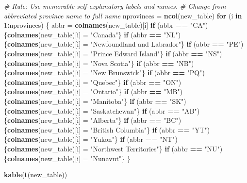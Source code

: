 \documentclass[9pt,letter]{article}
\newenvironment{Shaded}{\begin{snugshade}}{\end{snugshade}}
\newcommand{\KeywordTok}[1]{\textcolor[rgb]{0.13,0.29,0.53}{\textbf{#1}}}
\newcommand{\DecValTok}[1]{\textcolor[rgb]{0.00,0.00,0.81}{#1}}
\newcommand{\StringTok}[1]{\textcolor[rgb]{0.31,0.60,0.02}{#1}}
\newcommand{\CommentTok}[1]{\textcolor[rgb]{0.56,0.35,0.01}{\textit{#1}}}
\newcommand{\ControlFlowTok}[1]{\textcolor[rgb]{0.13,0.29,0.53}{\textbf{#1}}}
\newcommand{\OperatorTok}[1]{\textcolor[rgb]{0.81,0.36,0.00}{\textbf{#1}}}
\newcommand{\NormalTok}[1]{#1}
\begin{document}
\begin{Shaded}
\begin{Highlighting}[]
\CommentTok{# Rule: Use memorable self-explanatory labels and names.}
\CommentTok{# Change from abbreviated province name to full name}
\NormalTok{nprovinces =}\StringTok{ }\KeywordTok{ncol}\NormalTok{(new_table)}
\ControlFlowTok{for}\NormalTok{ (i }\ControlFlowTok{in} \DecValTok{1}\OperatorTok{:}\NormalTok{nprovinces) \{}
\NormalTok{  abbr =}\StringTok{ }\KeywordTok{colnames}\NormalTok{(new_table)[i]}
  \ControlFlowTok{if}\NormalTok{ (abbr }\OperatorTok{==}\StringTok{ "CA"}\NormalTok{) \{}\KeywordTok{colnames}\NormalTok{(new_table)[i] =}\StringTok{ "Canada"}\NormalTok{\}}
  \ControlFlowTok{if}\NormalTok{ (abbr }\OperatorTok{==}\StringTok{ "NL"}\NormalTok{) \{}\KeywordTok{colnames}\NormalTok{(new_table)[i] =}\StringTok{ "Newfoundland and Labrador"}\NormalTok{\}}
  \ControlFlowTok{if}\NormalTok{ (abbr }\OperatorTok{==}\StringTok{ "PE"}\NormalTok{) \{}\KeywordTok{colnames}\NormalTok{(new_table)[i] =}\StringTok{ "Prince Edward Island"}\NormalTok{\}}
  \ControlFlowTok{if}\NormalTok{ (abbr }\OperatorTok{==}\StringTok{ "NS"}\NormalTok{) \{}\KeywordTok{colnames}\NormalTok{(new_table)[i] =}\StringTok{ "Nova Scotia"}\NormalTok{\}}
  \ControlFlowTok{if}\NormalTok{ (abbr }\OperatorTok{==}\StringTok{ "NB"}\NormalTok{) \{}\KeywordTok{colnames}\NormalTok{(new_table)[i] =}\StringTok{ "New Brunswick"}\NormalTok{\}}
  \ControlFlowTok{if}\NormalTok{ (abbr }\OperatorTok{==}\StringTok{ "PQ"}\NormalTok{) \{}\KeywordTok{colnames}\NormalTok{(new_table)[i] =}\StringTok{ "Quebec"}\NormalTok{\}}
  \ControlFlowTok{if}\NormalTok{ (abbr }\OperatorTok{==}\StringTok{ "ON"}\NormalTok{) \{}\KeywordTok{colnames}\NormalTok{(new_table)[i] =}\StringTok{ "Ontario"}\NormalTok{\}}
  \ControlFlowTok{if}\NormalTok{ (abbr }\OperatorTok{==}\StringTok{ "MB"}\NormalTok{) \{}\KeywordTok{colnames}\NormalTok{(new_table)[i] =}\StringTok{ "Manitoba"}\NormalTok{\}}
  \ControlFlowTok{if}\NormalTok{ (abbr }\OperatorTok{==}\StringTok{ "SK"}\NormalTok{) \{}\KeywordTok{colnames}\NormalTok{(new_table)[i] =}\StringTok{ "Saskatchewan"}\NormalTok{\}}
  \ControlFlowTok{if}\NormalTok{ (abbr }\OperatorTok{==}\StringTok{ "AB"}\NormalTok{) \{}\KeywordTok{colnames}\NormalTok{(new_table)[i] =}\StringTok{ "Alberta"}\NormalTok{\}}
  \ControlFlowTok{if}\NormalTok{ (abbr }\OperatorTok{==}\StringTok{ "BC"}\NormalTok{) \{}\KeywordTok{colnames}\NormalTok{(new_table)[i] =}\StringTok{ "British Columbia"}\NormalTok{\}}
  \ControlFlowTok{if}\NormalTok{ (abbr }\OperatorTok{==}\StringTok{ "YT"}\NormalTok{) \{}\KeywordTok{colnames}\NormalTok{(new_table)[i] =}\StringTok{ "Yukon"}\NormalTok{\}}
  \ControlFlowTok{if}\NormalTok{ (abbr }\OperatorTok{==}\StringTok{ "NT"}\NormalTok{) \{}\KeywordTok{colnames}\NormalTok{(new_table)[i] =}\StringTok{ "Northwest Territories"}\NormalTok{\}}
  \ControlFlowTok{if}\NormalTok{ (abbr }\OperatorTok{==}\StringTok{ "NU"}\NormalTok{) \{}\KeywordTok{colnames}\NormalTok{(new_table)[i] =}\StringTok{ "Nunavut"}\NormalTok{\}}
\NormalTok{\}}

\KeywordTok{kable}\NormalTok{(}\KeywordTok{t}\NormalTok{(new_table))}
\end{Highlighting}
\end{Shaded}
\end{document}
